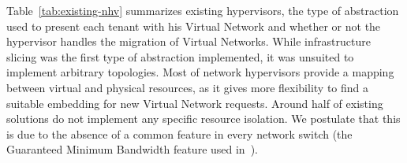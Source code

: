 Table~\ref{tab:existing-nhv} summarizes existing hypervisors, the type of abstraction used to present each tenant with his Virtual Network and whether or not the hypervisor handles the migration of Virtual Networks. While infrastructure slicing was the first type of abstraction implemented, it was unsuited to implement arbitrary topologies. Most of network hypervisors provide a mapping between virtual and physical resources, as it gives more flexibility to find a suitable embedding for new Virtual Network requests. Around half of existing solutions do not implement any specific resource isolation. We postulate that this is due to the absence of a common feature in every network switch (\eg the Guaranteed Minimum Bandwidth feature used in~\cite{EnhancedFV-Min2012}).
